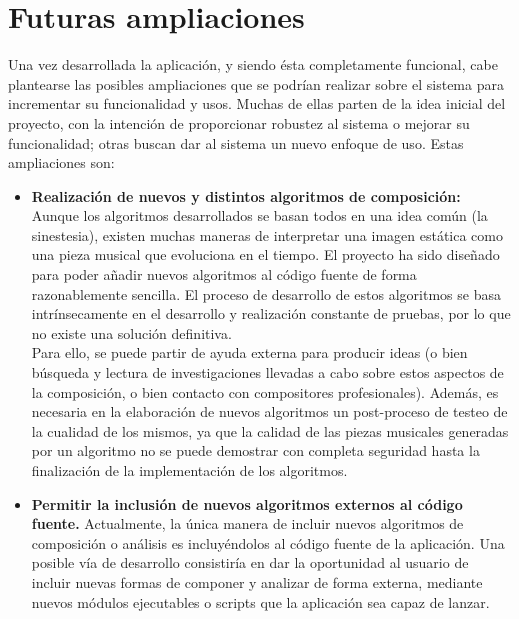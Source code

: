 \section{Futuras ampliaciones}
\label{sec:ampliaciones}

Una vez desarrollada la aplicación, y siendo ésta completamente funcional, cabe plantearse las posibles ampliaciones que se podrían realizar sobre el sistema para incrementar su funcionalidad y usos. Muchas de ellas parten de la idea inicial del proyecto, con la intención de proporcionar robustez al sistema o mejorar su funcionalidad; otras buscan dar al sistema un nuevo enfoque de uso. Estas ampliaciones son:

\begin{itemize}

\item\textbf{Realización de nuevos y distintos algoritmos de composición:} Aunque los algoritmos desarrollados se basan todos en una idea común (la sinestesia), existen muchas maneras de interpretar una imagen estática como una pieza musical que evoluciona en el tiempo. El proyecto ha sido diseñado para poder añadir nuevos algoritmos
al código fuente de forma razonablemente sencilla. El proceso de desarrollo de estos algoritmos se basa intrínsecamente en el desarrollo y realización constante de pruebas, por lo que no existe una solución definitiva.\\

Para ello, se puede partir de ayuda externa para producir ideas (o bien búsqueda y lectura de investigaciones llevadas a cabo sobre estos aspectos de la composición, o bien contacto con compositores profesionales). Además, es necesaria en la elaboración de nuevos algoritmos un post-proceso de testeo de la cualidad de los mismos, ya que la calidad de las piezas musicales generadas por un algoritmo no se puede demostrar con completa seguridad hasta la finalización de la implementación de los algoritmos.

\item\textbf{Permitir la inclusión de nuevos algoritmos externos al código fuente.} Actualmente, la única manera de incluir nuevos algoritmos de composición o análisis es incluyéndolos al código fuente de la aplicación. Una posible vía de desarrollo consistiría en dar la oportunidad al usuario de incluir nuevas formas de componer y analizar de forma externa, mediante nuevos módulos ejecutables o scripts que la aplicación sea capaz de lanzar.\\


\end{itemize}

